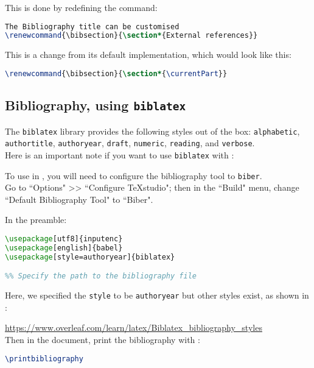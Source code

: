 This is done by redefining the  command:



\begin{lstlisting}[language=tex]
The Bibliography title can be customised
\renewcommand{\bibsection}{\section*{External references}}
\end{lstlisting}

\bigskip

This is a change from its default implementation, which would look like this:
\begin{lstlisting}[language=tex]
\renewcommand{\bibsection}{\section*{\currentPart}}
\end{lstlisting}

\newpage

\subsection{Bibliography, using \texttt{biblatex}}

The \texttt{biblatex} library provides the following styles out of the box: \texttt{alphabetic}, \texttt{authortitle}, \texttt{authoryear}, \texttt{draft}, \texttt{numeric}, \texttt{reading}, and \texttt{verbose}. \\

Here is an important note if you want to use \texttt{biblatex} with \TeXstudio:


\begin{note}
To use  in \TeXstudio, you will need to configure the bibliography tool to \texttt{biber}. \\

Go to ``Options" >> ``Configure TeXstudio"; then in the ``Build" menu, change ``Default Bibliography Tool" to ``Biber".
\end{note}

\bigskip

In the preamble:
\begin{lstlisting}[language=tex]
\usepackage[utf8]{inputenc}
\usepackage[english]{babel}
\usepackage[style=authoryear]{biblatex}

%% Specify the path to the bibliography file

\end{lstlisting}

Here, we specified the \texttt{style} to be \texttt{authoryear} but other styles exist, as shown in \cite{bibliography-styles} :

\hfill \url{https://www.overleaf.com/learn/latex/Biblatex_bibliography_styles} \\

Then in the document, print the bibliography with :

\begin{lstlisting}[language=tex]
\printbibliography
\end{lstlisting}
